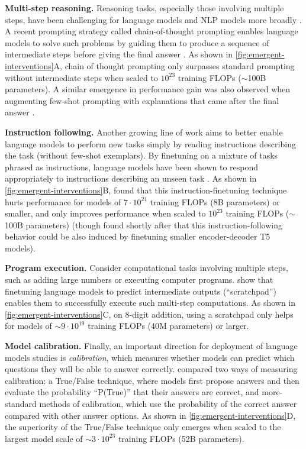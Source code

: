 \textbf{Multi-step reasoning.} Reasoning tasks, especially those involving multiple steps, have been challenging for language models and NLP models more broadly \citep{rae2021scaling,bommasani2021opportunities,nye2021show}. A recent prompting strategy called chain-of-thought prompting enables language models to solve such problems by guiding them to produce a sequence of intermediate steps before giving the final answer \citep{cobbe2021training,wei2022chain,suzgun2022challenging}. As shown in \ref{fig:emergent-interventions}A, chain of thought prompting only surpasses standard prompting without intermediate steps when scaled to $10^{23}$ training FLOPs ($\sim$100B parameters). A similar emergence in performance gain was also observed when augmenting few-shot prompting with explanations that came after the final answer \citep{lampinen2022can}.

\textbf{Instruction following.} Another growing line of work aims to better enable language models to perform new tasks simply by reading instructions describing the task (without few-shot exemplars). By finetuning on a mixture of tasks phrased as instructions, language models have been shown to respond appropriately to instructions describing an unseen task \citep{ouyang2022training,wei2021finetuned,sanh2022multitask,chung2022scaling}. As shown in \ref{fig:emergent-interventions}B, \citet{wei2021finetuned} found that this instruction-finetuning technique hurts performance for models of $7 \cdot 10^{21}$ training FLOPs (8B parameters) or smaller, and only improves performance when scaled to $10^{23}$ training FLOPs ($\sim$100B parameters) (though \citet{sanh2022multitask} found shortly after that this instruction-following behavior could be also induced by finetuning smaller encoder-decoder T5 models).

\textbf{Program execution.} Consider computational tasks involving multiple steps, such as adding large numbers or executing computer programs.
\citet{nye2021show} show that finetuning language models to predict intermediate outputs (``scratchpad'') enables them to successfully execute such multi-step computations. As shown in \ref{fig:emergent-interventions}C, on 8-digit addition, using a scratchpad only helps for models of ${\sim}9 \cdot 10^{19}$ training FLOPs (40M parameters) or larger. 

\textbf{Model calibration.} Finally, an important direction for deployment of language models studies is \textit{calibration}, which measures whether models can predict which questions they will be able to answer correctly. 
\citet{kadavath2022language} compared two ways of measuring calibration: a True/False technique, where models first propose answers and then evaluate the probability ``P(True)'' that their answers are correct, and more-standard methods of calibration, which use the probability of the correct answer compared with other answer options. As shown in \ref{fig:emergent-interventions}D, the superiority of the True/False technique only emerges when scaled to the largest model scale of ${\sim}3 \cdot 10^{23}$ training FLOPs (52B parameters).

